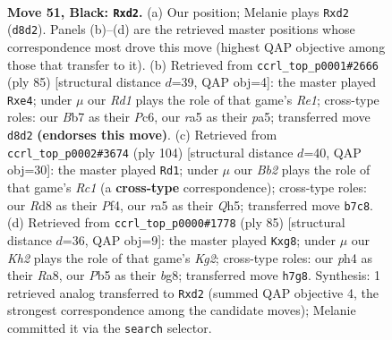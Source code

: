 \documentclass[11pt]{article}
\begin{document}
\clearpage

\begin{figure}[p]\centering
\begin{subfigure}{0.46\textwidth}\centering
\resizebox{\linewidth}{!}{%
\newchessgame
\chessboard[
  setfen={3rr3/1b3p1k/6p1/Rp6/7P/1P6/2PN4/R2B1K2 b - - 3 51},
  showmover=false,
  pgfstyle=straightmove, color=movearrow, markmove={d8-d2}
]}
\caption{}
\end{subfigure}\hfill
\begin{subfigure}{0.46\textwidth}\centering
\resizebox{\linewidth}{!}{%
\newchessgame
\chessboard[
  setfen={3rr3/6pk/2p5/P6p/4B2P/1Pp3P1/7K/R4R2 b - - 0 43},
  showmover=false,
  pgfstyle=straightmove, color=movearrow, markmove={e8-e4}
]}
\caption{}
\end{subfigure}
\\[4pt]
\begin{subfigure}{0.46\textwidth}\centering
\resizebox{\linewidth}{!}{%
\newchessgame
\chessboard[
  setfen={r4k2/Pb1n4/1r6/7Q/4pP1p/6p1/6P1/2R3K1 w - - 2 53},
  showmover=false,
  pgfstyle=straightmove, color=movearrow, markmove={c1-d1}
]}
\caption{}
\end{subfigure}\hfill
\begin{subfigure}{0.46\textwidth}\centering
\resizebox{\linewidth}{!}{%
\newchessgame
\chessboard[
  setfen={r2r2B1/6k1/2p2p1p/2N1bP2/6PK/1P6/4R3/4R3 b - - 0 43},
  showmover=false,
  pgfstyle=straightmove, color=movearrow, markmove={g7-g8}
]}
\caption{}
\end{subfigure}
\caption{\textbf{Move 51, Black: \texttt{Rxd2}.} (a) Our position; Melanie plays \texttt{Rxd2} (\texttt{d8d2}). Panels (b)--(d) are the retrieved master positions whose correspondence most drove this move (highest QAP objective among those that transfer to it). (b) Retrieved from \texttt{ccrl\_top\_p0001\#2666} (ply 85) [structural distance $d$=39, QAP obj=4]: the master played \texttt{Rxe4}; under $\mu$ our \emph{Rd1} plays the role of that game's \emph{Re1}; cross-type roles: our \emph{B}b7 as their \emph{P}c6, our \emph{r}a5 as their \emph{p}a5; transferred move \texttt{d8d2} \textbf{(endorses this move)}. (c) Retrieved from \texttt{ccrl\_top\_p0002\#3674} (ply 104) [structural distance $d$=40, QAP obj=30]: the master played \texttt{Rd1}; under $\mu$ our \emph{Bb2} plays the role of that game's \emph{Rc1} (a \textbf{cross-type} correspondence); cross-type roles: our \emph{R}d8 as their \emph{P}f4, our \emph{r}a5 as their \emph{Q}h5; transferred move \texttt{b7c8}. (d) Retrieved from \texttt{ccrl\_top\_p0000\#1778} (ply 85) [structural distance $d$=36, QAP obj=9]: the master played \texttt{Kxg8}; under $\mu$ our \emph{Kh2} plays the role of that game's \emph{Kg2}; cross-type roles: our \emph{p}h4 as their \emph{R}a8, our \emph{P}b5 as their \emph{b}g8; transferred move \texttt{h7g8}. Synthesis: 1 retrieved analog transferred to \texttt{Rxd2} (summed QAP objective 4, the strongest correspondence among the candidate moves); Melanie committed it via the \texttt{search} selector.}
\label{fig:thought-m101}
\end{figure}
\end{document}
